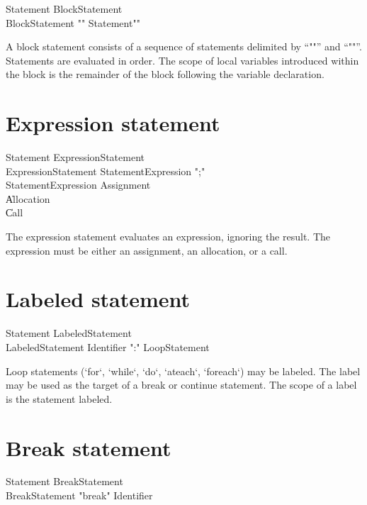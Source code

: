 \begin{grammar}
Statement \: BlockStatement \\
BlockStatement \: \xcd"{" Statement\star \xcd"}" \\
\end{grammar}

A block statement consists of a sequence of statements delimited
by ``\xcd"{"'' and ``\xcd"}"''.  Statements are evaluated in
order.  The scope of local variables introduced within the block  
is the remainder of the block following the variable declaration.

\section{Expression statement}

\begin{grammar}
Statement \: ExpressionStatement \\
ExpressionStatement \: StatementExpression \xcd";" \\
StatementExpression \: Assignment \\
          \| Allocation \\
          \| Call \\
\end{grammar}

The expression statement evaluates an expression, ignoring the
result.  The expression must be either an assignment, an
allocation, or a call.

\section{Labeled statement}

\begin{grammar}
Statement \: LabeledStatement \\
LabeledStatement \: Identifier \xcd":" LoopStatement \\
\end{grammar}

Loop statements (\xcd`for`, \xcd`while`, \xcd`do`, \xcd`ateach`,
\xcd`foreach`) may be labeled. The label may be used as the target of a break
or continue statement. The scope of a label is the statement labeled.

\section{Break statement}

\begin{grammar}
Statement \: BreakStatement \\
BreakStatement \: \xcd"break" Identifier\opt \\
\end{grammar}

